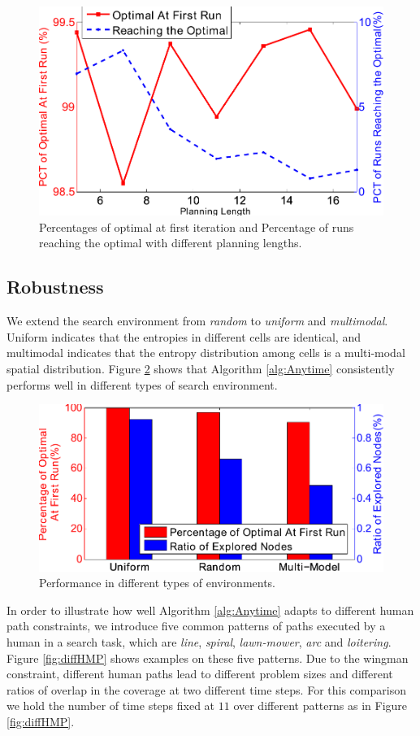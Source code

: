 \begin{figure}
\centering
\includegraphics[width=0.7\linewidth]{./images/T_InitOpt_OptRch.pdf}
\caption{Percentages of optimal at first iteration and Percentage of runs reaching the optimal with different planning lengths.}
\label{fig:diffT:a2}
\end{figure}

\subsection{Robustness}

We extend the search environment from \emph{random} to \emph{uniform} and \emph{multimodal}.
Uniform indicates that the entropies in different cells are identical, and multimodal indicates that the entropy distribution among cells is a multi-modal spatial distribution.
Figure \ref{fig:EnvPerform} shows that Algorithm \ref{alg:Anytime} consistently performs well in different types of search environment.

\begin{figure}
\centering
\includegraphics[width=0.7\linewidth]{./images/EnvPerform}
\caption{Performance in different types of environments.}
\label{fig:EnvPerform}
\end{figure}

In order to illustrate how well Algorithm \ref{alg:Anytime} adapts to different human path constraints, we introduce five common patterns of paths executed by a human in a search task, which are \emph{line}, \emph{spiral}, \emph{lawn-mower}, \emph{arc} and \emph{loitering}.
Figure \ref{fig:diffHMP} shows examples on these five patterns.
Due to the wingman constraint, different human paths lead to different problem sizes and different ratios of overlap in the coverage at two different time steps.
For this comparison we hold the number of time steps fixed at $ 11 $ over different patterns as in Figure \ref{fig:diffHMP}. 

